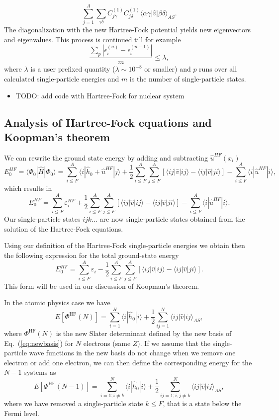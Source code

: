 \documentclass[%
oneside,                 %
final,                   %
10pt]{article}
\begin{document}
\noindent
\[
\sum_{j = 1}^A\sum_{\gamma\delta} C_{j\gamma}^{(1)}C_{j\delta}^{(1)}\langle \alpha\gamma|\hat{v}|\beta\delta\rangle_{AS}.
\]
The diagonalization with the new Hartree-Fock potential yields new eigenvectors and eigenvalues.
This process is continued till for example
\[
\frac{\sum_{p} |\epsilon_i^{(n)}-\epsilon_i^{(n-1)}|}{m} \le \lambda,  
\]
where $\lambda$ is a user prefixed quantity ($\lambda \sim 10^{-8}$ or smaller) and $p$ runs over all calculated single-particle
energies and $m$ is the number of single-particle states.

\begin{itemize}
\item TODO: add code with Hartree-Fock for nuclear system
\end{itemize}

\noindent
\subsection{Analysis of Hartree-Fock equations and Koopman's theorem}

We can rewrite the ground state energy by adding and subtracting $\hat{u}^{HF}(x_i)$ 
\[
  E_0^{HF} =\langle \Phi_0 | \hat{H} | \Phi_0\rangle = 
\sum_{i\le F}^A \langle i | \hat{h}_0 +\hat{u}^{HF}| j\rangle+ \frac{1}{2}\sum_{i\le F}^A\sum_{j \le F}^A\left[\langle ij |\hat{v}|ij \rangle-\langle ij|\hat{v}|ji\rangle\right]-\sum_{i\le F}^A \langle i |\hat{u}^{HF}| i\rangle,
\]
which results in
\[
  E_0^{HF}
  = \sum_{i\le F}^A \varepsilon_i^{HF} + \frac{1}{2}\sum_{i\le F}^A\sum_{j \le F}^A\left[\langle ij |\hat{v}|ij \rangle-\langle ij|\hat{v}|ji\rangle\right]-\sum_{i\le F}^A \langle i |\hat{u}^{HF}| i\rangle.
\]
Our single-particle states $ijk\dots$ are now single-particle states obtained from the solution of the Hartree-Fock equations.



Using our definition of the Hartree-Fock single-particle energies we obtain then the following expression for the total ground-state energy
\[
  E_0^{HF}
  = \sum_{i\le F}^A \varepsilon_i - \frac{1}{2}\sum_{i\le F}^A\sum_{j \le F}^A\left[\langle ij |\hat{v}|ij \rangle-\langle ij|\hat{v}|ji\rangle\right].
\]
This form will be used in our discussion of Koopman's theorem.



In the   atomic physics case we have 
\[
  E[\Phi^{\mathrm{HF}}(N)] 
  = \sum_{i=1}^H \langle i | \hat{h}_0 | i \rangle +
  \frac{1}{2}\sum_{ij=1}^N\langle ij|\hat{v}|ij\rangle_{AS},
\]
where $\Phi^{\mathrm{HF}}(N)$ is the new Slater determinant defined by the new basis of Eq.~(\ref{eq:newbasis})
for $N$ electrons (same $Z$).  If we assume that the single-particle wave functions in the new basis do not change 
when we remove one electron or add one electron, we can then define the corresponding energy for the $N-1$ systems as 
\[
  E[\Phi^{\mathrm{HF}}(N-1)] 
  = \sum_{i=1; i\ne k}^N \langle i | \hat{h}_0 | i \rangle +
  \frac{1}{2}\sum_{ij=1;i,j\ne k}^N\langle ij|\hat{v}|ij\rangle_{AS},
\]
where we have removed a single-particle state $k\le F$, that is a state below the Fermi level.  
\end{document}
